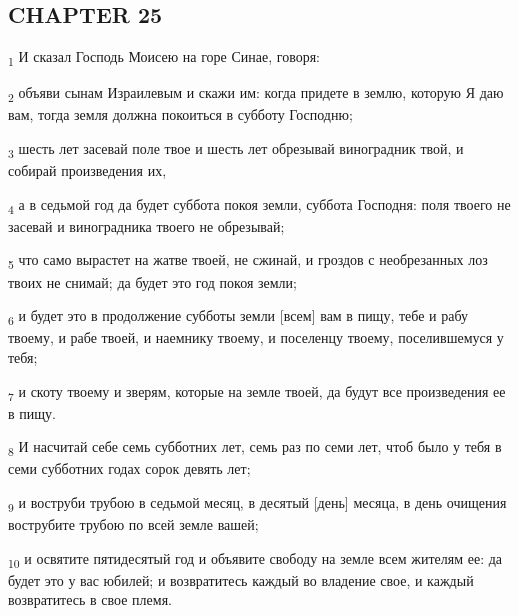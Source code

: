 \subsection{CHAPTER 25}
\begin{tcolorbox}
\textsubscript{1} И сказал Господь Моисею на горе Синае, говоря:
\end{tcolorbox}
\begin{tcolorbox}
\textsubscript{2} объяви сынам Израилевым и скажи им: когда придете в землю, которую Я даю вам, тогда земля должна покоиться в субботу Господню;
\end{tcolorbox}
\begin{tcolorbox}
\textsubscript{3} шесть лет засевай поле твое и шесть лет обрезывай виноградник твой, и собирай произведения их,
\end{tcolorbox}
\begin{tcolorbox}
\textsubscript{4} а в седьмой год да будет суббота покоя земли, суббота Господня: поля твоего не засевай и виноградника твоего не обрезывай;
\end{tcolorbox}
\begin{tcolorbox}
\textsubscript{5} что само вырастет на жатве твоей, не сжинай, и гроздов с необрезанных лоз твоих не снимай; да будет это год покоя земли;
\end{tcolorbox}
\begin{tcolorbox}
\textsubscript{6} и будет это в продолжение субботы земли [всем] вам в пищу, тебе и рабу твоему, и рабе твоей, и наемнику твоему, и поселенцу твоему, поселившемуся у тебя;
\end{tcolorbox}
\begin{tcolorbox}
\textsubscript{7} и скоту твоему и зверям, которые на земле твоей, да будут все произведения ее в пищу.
\end{tcolorbox}
\begin{tcolorbox}
\textsubscript{8} И насчитай себе семь субботних лет, семь раз по семи лет, чтоб было у тебя в семи субботних годах сорок девять лет;
\end{tcolorbox}
\begin{tcolorbox}
\textsubscript{9} и воструби трубою в седьмой месяц, в десятый [день] месяца, в день очищения вострубите трубою по всей земле вашей;
\end{tcolorbox}
\begin{tcolorbox}
\textsubscript{10} и освятите пятидесятый год и объявите свободу на земле всем жителям ее: да будет это у вас юбилей; и возвратитесь каждый во владение свое, и каждый возвратитесь в свое племя.
\end{tcolorbox}
